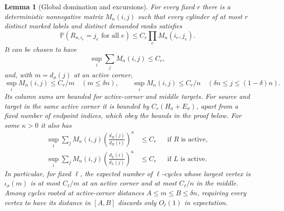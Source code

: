 \documentclass[11pt]{article}
\newtheorem{lemma}[theorem]{Lemma}
\theoremstyle{remark}
\theoremstyle{plain}
\newcommand{\Pp}{\mathbb P}
\begin{document}
\begin{lemma}[Global domination and excursions]\label{lem:sp-domination}
For every fixed $r$ there is a deterministic nonnegative matrix $M_n(i,j)$
such that every cylinder of at most $r$ distinct marked labels and distinct
demanded ranks satisfies
\begin{equation}\label{eq:sp-global-cylinder-bound}
 \Pp(R_{n,i_e}=j_e\text{ for all }e)\le C_r\prod_eM_n(i_e,j_e).
\end{equation}
It can be chosen to have
\begin{equation}\label{eq:sp-global-row-bound}
 \sup_i\sum_jM_n(i,j)\le C_r,
\end{equation}
and, with $m=d_\sigma(j)$ at an active corner,
\begin{equation}\label{eq:sp-global-target-bound}
 \sup_iM_n(i,j)\le C_r/m
       \quad(m\le\delta n),\qquad
 \sup_iM_n(i,j)\le C_r/n
       \quad(\delta n\le j\le(1-\delta)n).
\end{equation}
Its column sums are bounded for active-corner and middle targets.  For
source and target in the same active corner it is bounded by
$C_r(H_\sigma+E_\sigma)$, apart from a fixed number of endpoint indices,
which obey the bounds in the proof below.  For some $\kappa>0$ it also has
\begin{align}
 \sup_i\sum_jM_n(i,j)
       \left(\frac{d_R(j)}{d_R(i)}\right)^\kappa&\le C_r
          &&\text{if $R$ is active},\label{eq:sp-right-weighted-row}\\
 \sup_i\sum_jM_n(i,j)
       \left(\frac{d_L(i)}{d_L(j)}\right)^\kappa&\le C_r
          &&\text{if $L$ is active}.\label{eq:sp-left-weighted-row}
\end{align}
In particular, for fixed $\ell$, the expected number of $\ell$-cycles
whose largest vertex is $\iota_\sigma(m)$ is at most $C_\ell/m$ at an
active corner and at most $C_\ell/n$ in the middle.  Among cycles rooted at
active-corner distances $A\le m\le B\le\delta n$, requiring every vertex
to have its distance in $[A,B]$ discards only $O_\ell(1)$ in expectation.
\end{lemma}
\end{document}
